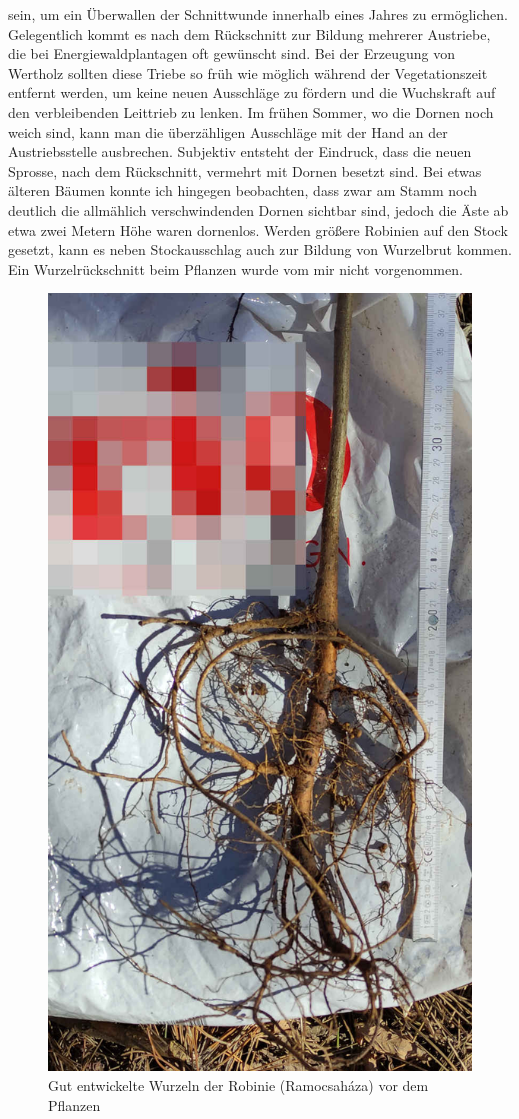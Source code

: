 \documentclass[twocolumn]{scrartcl}
\begin{document}
sein, um ein Überwallen der Schnittwunde innerhalb eines Jahres zu
ermöglichen. Gelegentlich kommt es nach dem Rückschnitt zur Bildung
mehrerer Austriebe, die bei Energiewaldplantagen oft gewünscht sind.
Bei der Erzeugung von Wertholz sollten diese Triebe so früh wie
möglich während der Vegetationszeit entfernt werden, um keine neuen
Ausschläge zu fördern und die Wuchskraft auf den verbleibenden
Leittrieb zu lenken.
Im frühen Sommer, wo die Dornen noch weich sind, kann man die
überzähligen Ausschläge mit der Hand an der Austriebsstelle
ausbrechen.
Subjektiv entsteht der Eindruck, dass die neuen
Sprosse, nach dem Rückschnitt, vermehrt mit Dornen besetzt sind.
Bei etwas älteren Bäumen konnte ich hingegen beobachten, dass zwar am
Stamm noch deutlich die allmählich verschwindenden Dornen sichtbar
sind, jedoch die Äste ab etwa zwei Metern Höhe waren dornenlos.
Werden größere Robinien auf den Stock gesetzt, kann es neben
Stockausschlag auch zur Bildung von Wurzelbrut kommen. Ein
Wurzelrückschnitt beim Pflanzen wurde vom mir nicht vorgenommen.

\begin{figure}[htbp]
  \centering
  \includegraphics[width=.9\linewidth]{./bild/wurzelRobinie}
  \caption{Gut entwickelte Wurzeln der Robinie (Ramocsaháza) vor dem Pflanzen}
  \label{fig:wurzelRobinie}
\end{figure}
\end{document}
